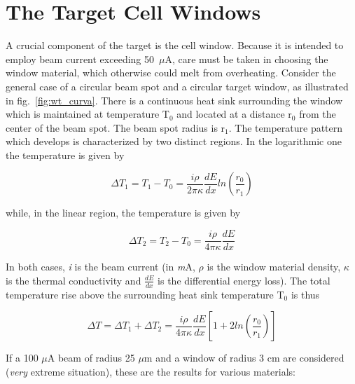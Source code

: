 \section{The Target Cell Windows}

A crucial component of the target is the cell window. Because it is
intended to employ beam current exceeding 50~$\mu $A, care must
be taken in choosing the window material, which otherwise could melt
from overheating. Consider the general case of a circular beam spot
and a circular target window, as illustrated in fig.~\ref{fig:wt_curva}.
There is a continuous heat sink surrounding the window which is maintained
at temperature T$_{0}$ and located at a distance r$_{0}$ from the
center of the beam spot. The beam spot radius is r$_{1}$. The temperature
pattern which develops is characterized by two distinct regions. In
the logarithmic one the temperature is given by

\begin{equation}
\Delta T_{1}=T_{1}-T_{0}=\frac{i\rho }{2\pi \kappa }\frac{dE}{dx}ln(\frac{r_{0}}{r_{1}})\end{equation}


while, in the linear region, the temperature is given by

\begin{equation}
\Delta T_{2}=T_{2}-T_{0}=\frac{i\rho }{4\pi \kappa }\frac{dE}{dx}\end{equation}


In both cases, \textit{i} is the beam current (in \textit{m}A, $\rho $
is the window material density, $\kappa $ is the thermal conductivity
and $\frac{dE}{dx}$ is the differential energy loss). The total temperature
rise above the surrounding heat sink temperature T$_{0}$ is thus

\begin{equation}
\Delta T=\Delta T_{1}+\Delta T_{2}=\frac{i\rho }{4\pi \kappa }\frac{dE}{dx}[1+2ln(\frac{r_{0}}{r_{1}})]\end{equation}


If a 100 $\mu $A beam of radius 25 $\mu $m and a window of radius
3 cm are considered (\textit{very} extreme situation), these are the
results for various materials:

